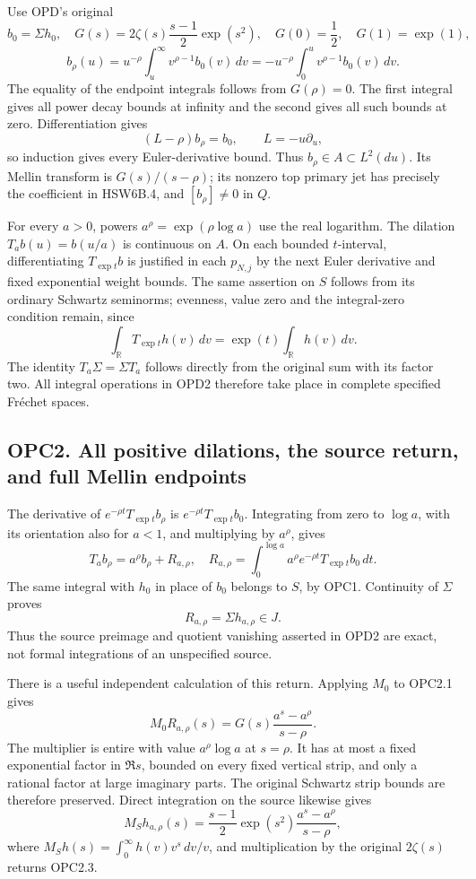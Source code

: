 Use OPD's original \[
b_0=\Sigma h_0,\quad
G(s)=2\zeta(s)\frac{s-1}{2}\exp(s^2),\quad
G(0)=\frac12,\quad G(1)=\exp(1),
\] \[
b_\rho(u)=u^{-\rho}\int_u^\infty v^{\rho-1}b_0(v)\,dv
=-u^{-\rho}\int_0^u v^{\rho-1}b_0(v)\,dv.
\tag{OPC1.1}
\] The equality of the endpoint integrals follows from \(G(\rho)=0\).
The first integral gives all power decay bounds at infinity and the
second gives all such bounds at zero. Differentiation gives \[
(L-\rho)b_\rho=b_0,\qquad L=-u\partial_u,
\] so induction gives every Euler-derivative bound. Thus
\(b_\rho\in A\subset L^2(du)\). Its Mellin transform is
\(G(s)/(s-\rho)\); its nonzero top primary jet has precisely the
coefficient in HSW6B.4, and \([b_\rho]\ne0\) in \(Q\).

For every \(a>0\), powers \(a^\rho=\exp(\rho\log a)\) use the real
logarithm. The dilation \(T_ab(u)=b(u/a)\) is continuous on \(A\). On
each bounded \(t\)-interval, differentiating \(T_{\exp t}b\) is
justified in each \(p_{N,j}\) by the next Euler derivative and fixed
exponential weight bounds. The same assertion on \(S\) follows from its
ordinary Schwartz seminorms; evenness, value zero and the integral-zero
condition remain, since \[
\int_{\mathbb{R}} T_{\exp t}h(v)\,dv=\exp(t)\int_{\mathbb{R}} h(v)\,dv.
\] The identity \(T_a\Sigma=\Sigma T_a\) follows directly from the
original sum with its factor two. All integral operations in OPD2
therefore take place in complete specified Fréchet spaces.

\subsection{OPC2. All positive dilations, the source return, and full
Mellin
endpoints}\label{opc2.-all-positive-dilations-the-source-return-and-full-mellin-endpoints}

The derivative of \(e^{-\rho t}T_{\exp t}b_\rho\) is
\(e^{-\rho t}T_{\exp t}b_0\). Integrating from zero to \(\log a\), with
its orientation also for \(a<1\), and multiplying by \(a^\rho\), gives
\[
T_ab_\rho=a^\rho b_\rho+R_{a,\rho},
\quad
R_{a,\rho}=\int_0^{\log a}a^\rho e^{-\rho t}T_{\exp t}b_0\,dt.
\tag{OPC2.1}
\] The same integral with \(h_0\) in place of \(b_0\) belongs to \(S\),
by OPC1. Continuity of \(\Sigma\) proves \[
R_{a,\rho}=\Sigma h_{a,\rho}\in J.
\tag{OPC2.2}
\] Thus the source preimage and quotient vanishing asserted in OPD2 are
exact, not formal integrations of an unspecified source.

There is a useful independent calculation of this return. Applying
\(M_0\) to OPC2.1 gives \[
\boxed{M_0R_{a,\rho}(s)
=G(s)\frac{a^s-a^\rho}{s-\rho}.}
\tag{OPC2.3}
\] The multiplier is entire with value \(a^\rho\log a\) at \(s=\rho\).
It has at most a fixed exponential factor in \(\Re s\), bounded on every
fixed vertical strip, and only a rational factor at large imaginary
parts. The original Schwartz strip bounds are therefore preserved.
Direct integration on the source likewise gives \[
M_Sh_{a,\rho}(s)=
\frac{s-1}{2}\exp(s^2)\frac{a^s-a^\rho}{s-\rho},
\] where \(M_Sh(s)=\int_0^\infty h(v)v^s\,dv/v\), and multiplication by
the original \(2\zeta(s)\) returns OPC2.3.

